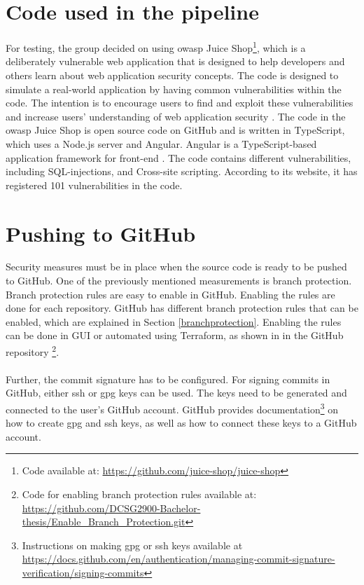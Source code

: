 \section{Code used in the pipeline}
For testing, the group decided on using \acrshort{owasp} Juice Shop\footnote{Code available at: \url{https://github.com/juice-shop/juice-shop}}, which is a deliberately vulnerable web application that is designed to help developers and others learn about web application security concepts. The code is designed to simulate a real-world application by having common vulnerabilities within the code. The intention is to encourage users to find and exploit these vulnerabilities and increase users' understanding of web application security \cite{owaspJuiceShop}. The code in the \acrshort{owasp} Juice Shop is open source code on GitHub and is written in TypeScript, which uses a Node.js server and Angular. Angular is a TypeScript-based application framework for \gls{front-end} \cite{owaspJuiceShopCode}. The code contains different vulnerabilities, including \gls{SQL-injection}s, and \gls{Cross-site scripting}. According to its website, it has registered 101 vulnerabilities in the code.
\newpage
\section{Pushing to GitHub}
Security measures must be in place when the source code is ready to be pushed to GitHub. One of the previously mentioned measurements is branch protection. Branch protection rules are easy to enable in GitHub. Enabling the rules are done for each repository. GitHub has different branch protection rules that can be enabled, which are explained in Section \ref{branchprotection}. Enabling the rules can be done in \gls{GUI} or automated using Terraform, as shown in in the GitHub repository \footnote{Code for enabling branch protection rules available at: \url{https://github.com/DCSG2900-Bachelor-thesis/Enable_Branch_Protection.git}}. 
\\~\\
Further, the commit signature has to be configured. For signing commits in GitHub, either \acrshort{ssh} or \acrshort{gpg} keys can be used. The keys need to be generated and connected to the user's GitHub account. GitHub provides documentation\footnote{Instructions on making \acrshort{gpg} or \acrshort{ssh} keys available at \url{https://docs.github.com/en/authentication/managing-commit-signature-verification/signing-commits}} on how to create \acrshort{gpg} and \acrshort{ssh} keys, as well as how to connect these keys to a GitHub account.

